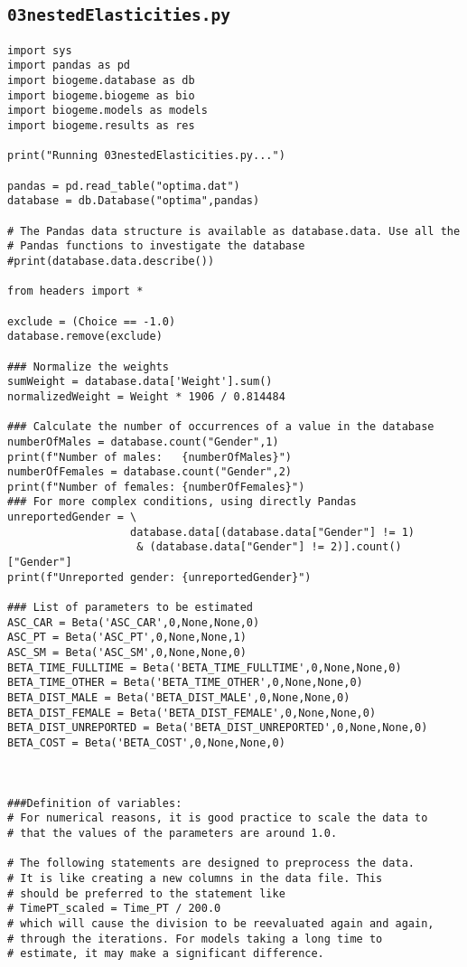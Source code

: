\documentclass[12pt,a4paper]{article}
\begin{document}
\subsection{\lstinline$03nestedElasticities.py$}
\label{sec:03nestedElasticities}
\begin{lstlisting}[style=numbers]
import sys
import pandas as pd
import biogeme.database as db
import biogeme.biogeme as bio
import biogeme.models as models
import biogeme.results as res

print("Running 03nestedElasticities.py...")

pandas = pd.read_table("optima.dat")
database = db.Database("optima",pandas)

# The Pandas data structure is available as database.data. Use all the
# Pandas functions to investigate the database
#print(database.data.describe())

from headers import *

exclude = (Choice == -1.0)
database.remove(exclude)

### Normalize the weights
sumWeight = database.data['Weight'].sum()
normalizedWeight = Weight * 1906 / 0.814484

### Calculate the number of occurrences of a value in the database
numberOfMales = database.count("Gender",1)
print(f"Number of males:   {numberOfMales}")
numberOfFemales = database.count("Gender",2)
print(f"Number of females: {numberOfFemales}")
### For more complex conditions, using directly Pandas
unreportedGender = \
                   database.data[(database.data["Gender"] != 1)
                    & (database.data["Gender"] != 2)].count()["Gender"]
print(f"Unreported gender: {unreportedGender}")

### List of parameters to be estimated
ASC_CAR = Beta('ASC_CAR',0,None,None,0)
ASC_PT = Beta('ASC_PT',0,None,None,1)
ASC_SM = Beta('ASC_SM',0,None,None,0)
BETA_TIME_FULLTIME = Beta('BETA_TIME_FULLTIME',0,None,None,0)
BETA_TIME_OTHER = Beta('BETA_TIME_OTHER',0,None,None,0)
BETA_DIST_MALE = Beta('BETA_DIST_MALE',0,None,None,0)
BETA_DIST_FEMALE = Beta('BETA_DIST_FEMALE',0,None,None,0)
BETA_DIST_UNREPORTED = Beta('BETA_DIST_UNREPORTED',0,None,None,0)
BETA_COST = Beta('BETA_COST',0,None,None,0)



###Definition of variables:
# For numerical reasons, it is good practice to scale the data to
# that the values of the parameters are around 1.0.

# The following statements are designed to preprocess the data.
# It is like creating a new columns in the data file. This
# should be preferred to the statement like
# TimePT_scaled = Time_PT / 200.0
# which will cause the division to be reevaluated again and again,
# through the iterations. For models taking a long time to
# estimate, it may make a significant difference.


\end{lstlisting}
\end{document}
